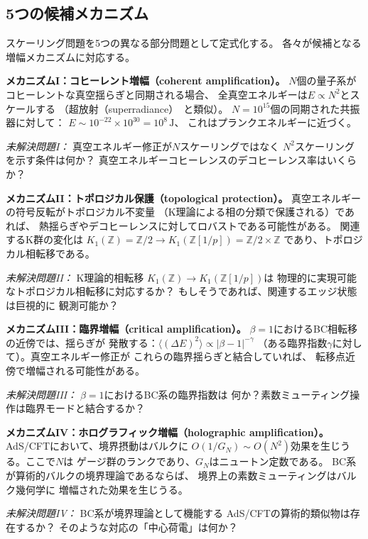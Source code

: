 \documentclass[11pt,a4paper]{article}
\newcommand{\Zp}{\mathbb{Z}[1/p]}
\begin{document}
\subsection{5つの候補メカニズム}

スケーリング問題を5つの異なる部分問題として定式化する。
各々が候補となる増幅メカニズムに対応する。

\textbf{メカニズムI：コヒーレント増幅（coherent amplification）。}
$N$個の量子系がコヒーレントな真空揺らぎと同期される場合、
全真空エネルギーは$E \propto N^2$とスケールする
（超放射（superradiance）~\cite{Dicke1954}と類似）。
$N = 10^{15}$個の同期された共振器に対して：
$E \sim 10^{-22} \times 10^{30} = 10^{8}\,\mathrm{J}$、
これはプランクエネルギーに近づく。

\textit{未解決問題I：} 真空エネルギー修正が$N$スケーリングではなく
$N^2$スケーリングを示す条件は何か？
真空エネルギーコヒーレンスのデコヒーレンス率はいくらか？

\textbf{メカニズムII：トポロジカル保護（topological protection）。}
真空エネルギーの符号反転がトポロジカル不変量
（K理論による相の分類で保護される）であれば、
熱揺らぎやデコヒーレンスに対してロバストである可能性がある。
関連するK群の変化は
$K_1(\mathbb{Z}) = \mathbb{Z}/2 \to K_1(\Zp) = \mathbb{Z}/2 \times \mathbb{Z}$
であり、トポロジカル相転移である。

\textit{未解決問題II：} K理論的相転移
$K_1(\mathbb{Z}) \to K_1(\Zp)$は
物理的に実現可能なトポロジカル相転移に対応するか？
もしそうであれば、関連するエッジ状態は巨視的に
観測可能か？

\textbf{メカニズムIII：臨界増幅（critical amplification）。}
$\beta = 1$におけるBC相転移の近傍では、揺らぎが
発散する：$\langle (\Delta E)^2 \rangle \propto |\beta - 1|^{-\gamma}$
（ある臨界指数$\gamma$に対して）。真空エネルギー修正が
これらの臨界揺らぎと結合していれば、
転移点近傍で増幅される可能性がある。

\textit{未解決問題III：} $\beta = 1$におけるBC系の臨界指数は
何か？素数ミューティング操作は臨界モードと結合するか？

\textbf{メカニズムIV：ホログラフィック増幅（holographic amplification）。}
AdS/CFTにおいて、境界摂動はバルクに
$O(1/G_N) \sim O(N^2)$効果を生じうる。ここで$N$は
ゲージ群のランクであり、$G_N$はニュートン定数である。
BC系が算術的バルクの境界理論であるならば、
境界上の素数ミューティングはバルク幾何学に
増幅された効果を生じうる。

\textit{未解決問題IV：} BC系が境界理論として機能する
AdS/CFTの算術的類似物は存在するか？
そのような対応の「中心荷電」は何か？
\end{document}
